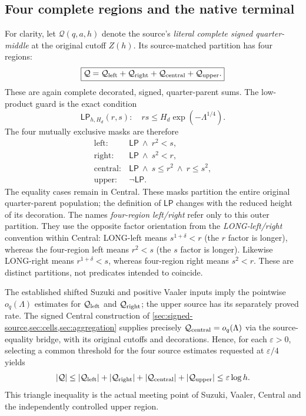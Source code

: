 \documentclass[11pt]{article}
\theoremstyle{definition}
\theoremstyle{remark}
\newcommand{\1}{\mathbf 1}
\begin{document}
\subsection{Four complete regions and the native terminal}

For clarity, let $\mathcal Q(q,a,h)$ denote the source's
\emph{literal complete signed quarter-middle} at the original
cutoff $Z(h)$. Its source-matched partition has four regions:
\begin{equation}\label{eq:four-region-identity}
 \boxed{\mathcal Q=\mathcal Q_{\rm left}+\mathcal Q_{\rm right}
    +\mathcal Q_{\rm central}+\mathcal Q_{\rm upper}.}
\end{equation}
These are again complete decorated, signed, quarter-parent sums.
The low-product guard is the exact condition
\[
 \mathsf{LP}_{h,H_d}(r,s):\quad
 rs\le H_d\exp(-\Lambda^{1/4}).
\]
The four mutually exclusive masks are therefore
\[
\begin{array}{ll}
 \mathrm{left}:&\mathsf{LP}\ \wedge\ r^2<s,\\
 \mathrm{right}:&\mathsf{LP}\ \wedge\ s^2<r,\\
 \mathrm{central}:&\mathsf{LP}\ \wedge\ s\le r^2\ \wedge\ r\le s^2,\\
 \mathrm{upper}:&\neg\mathsf{LP}.
\end{array}
\]
The equality cases remain in Central. These masks partition the
entire original quarter-parent population; the definition of
\(\mathsf{LP}\) changes with the reduced height of its decoration.
The names \emph{four-region left/right} refer only to this outer
partition. They use the opposite factor orientation from the
\emph{LONG-left/right} convention within Central: LONG-left means
$s^{1+\delta}<r$ (the $r$ factor is longer), whereas the four-region
left means $r^2<s$ (the $s$ factor is longer). Likewise LONG-right
means $r^{1+\delta}<s$, whereas four-region right means $s^2<r$.
These are distinct partitions, not predicates intended to coincide.

The established shifted Suzuki and positive Vaaler inputs imply the
pointwise $o_q(\Lambda)$ estimates for $\mathcal Q_{\rm left}$
and $\mathcal Q_{\rm right}$; the upper source has its separately
proved rate. The signed Central construction of
\cref{sec:signed-source,sec:cells,sec:aggregation} supplies precisely
$\mathcal Q_{\rm central}=o_q(\Lambda)$ via the source-equality
bridge, with its original cutoffs and decorations. Hence, for each
$\varepsilon>0$, selecting a common threshold for the four source
estimates requested at $\varepsilon/4$ yields
\begin{equation}\label{eq:four-region-budget}
 |\mathcal Q|\le
 |\mathcal Q_{\rm left}|+|\mathcal Q_{\rm right}|+
 |\mathcal Q_{\rm central}|+|\mathcal Q_{\rm upper}|
 \le\varepsilon\log h.
\end{equation}
This triangle inequality is the actual meeting point of Suzuki,
Vaaler, Central and the independently controlled upper region.
\end{document}
